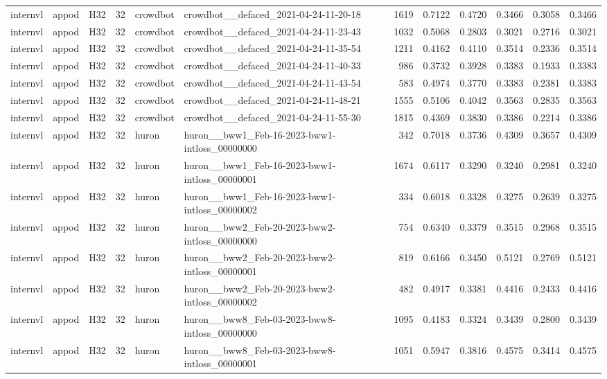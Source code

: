 \begin{table}[tbp]
\begin{tabular}{lllrllrrrrrr}
internvl & appod & H32 & 32 & crowdbot & crowdbot\_\_defaced\_2021-04-24-11-20-18 & 1619 & 0.7122 & 0.4720 & 0.3466 & 0.3058 & 0.3466 \\
internvl & appod & H32 & 32 & crowdbot & crowdbot\_\_defaced\_2021-04-24-11-23-43 & 1032 & 0.5068 & 0.2803 & 0.3021 & 0.2716 & 0.3021 \\
internvl & appod & H32 & 32 & crowdbot & crowdbot\_\_defaced\_2021-04-24-11-35-54 & 1211 & 0.4162 & 0.4110 & 0.3514 & 0.2336 & 0.3514 \\
internvl & appod & H32 & 32 & crowdbot & crowdbot\_\_defaced\_2021-04-24-11-40-33 & 986 & 0.3732 & 0.3928 & 0.3383 & 0.1933 & 0.3383 \\
internvl & appod & H32 & 32 & crowdbot & crowdbot\_\_defaced\_2021-04-24-11-43-54 & 583 & 0.4974 & 0.3770 & 0.3383 & 0.2381 & 0.3383 \\
internvl & appod & H32 & 32 & crowdbot & crowdbot\_\_defaced\_2021-04-24-11-48-21 & 1555 & 0.5106 & 0.4042 & 0.3563 & 0.2835 & 0.3563 \\
internvl & appod & H32 & 32 & crowdbot & crowdbot\_\_defaced\_2021-04-24-11-55-30 & 1815 & 0.4369 & 0.3830 & 0.3386 & 0.2214 & 0.3386 \\
internvl & appod & H32 & 32 & huron & huron\_\_bww1\_Feb-16-2023-bww1-intloss\_00000000 & 342 & 0.7018 & 0.3736 & 0.4309 & 0.3657 & 0.4309 \\
internvl & appod & H32 & 32 & huron & huron\_\_bww1\_Feb-16-2023-bww1-intloss\_00000001 & 1674 & 0.6117 & 0.3290 & 0.3240 & 0.2981 & 0.3240 \\
internvl & appod & H32 & 32 & huron & huron\_\_bww1\_Feb-16-2023-bww1-intloss\_00000002 & 334 & 0.6018 & 0.3328 & 0.3275 & 0.2639 & 0.3275 \\
internvl & appod & H32 & 32 & huron & huron\_\_bww2\_Feb-20-2023-bww2-intloss\_00000000 & 754 & 0.6340 & 0.3379 & 0.3515 & 0.2968 & 0.3515 \\
internvl & appod & H32 & 32 & huron & huron\_\_bww2\_Feb-20-2023-bww2-intloss\_00000001 & 819 & 0.6166 & 0.3450 & 0.5121 & 0.2769 & 0.5121 \\
internvl & appod & H32 & 32 & huron & huron\_\_bww2\_Feb-20-2023-bww2-intloss\_00000002 & 482 & 0.4917 & 0.3381 & 0.4416 & 0.2433 & 0.4416 \\
internvl & appod & H32 & 32 & huron & huron\_\_bww8\_Feb-03-2023-bww8-intloss\_00000000 & 1095 & 0.4183 & 0.3324 & 0.3439 & 0.2800 & 0.3439 \\
internvl & appod & H32 & 32 & huron & huron\_\_bww8\_Feb-03-2023-bww8-intloss\_00000001 & 1051 & 0.5947 & 0.3816 & 0.4575 & 0.3414 & 0.4575 \\

\end{tabular}
\end{table}
